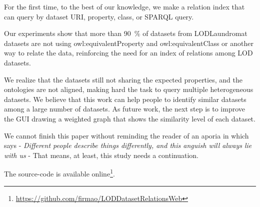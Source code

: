 \documentclass[sw]{iosart2x}
\begin{document}
For the first time, to the best of our knowledge, we make a relation index that can query by dataset URI, property, class, or SPARQL query.

Our experiments show that more than \SI{90}{\percent} of datasets from LODLaundromat datasets are not using owl:equivalentProperty and owl:equivalentClass or another way to relate the data, reinforcing the need for an index of relations among LOD datasets.

We realize that the datasets still not sharing the expected properties, and the ontologies are not aligned, making hard the task to query multiple heterogeneous datasets.
We believe that this work can help people to identify similar datasets among a large number of datasets.
As future work, the next step is to improve the GUI drawing a weighted graph that shows the similarity level of each dataset.

We cannot finish this paper without reminding the reader of an aporia in which says - \textit{Different people describe things differently, and this anguish will always lie with us} - That means, at least, this study needs a continuation.

The source-code is available online\footnote{\url{https://github.com/firmao/LODDatasetRelationsWeb}}.

\end{document}
